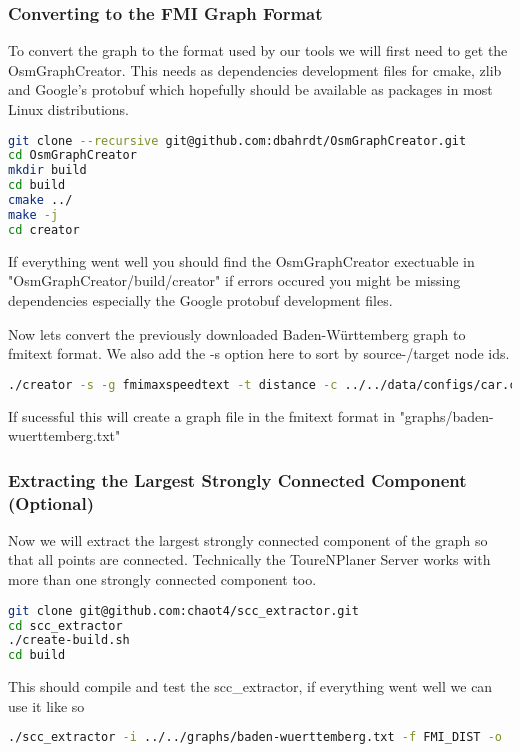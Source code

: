 \documentclass[titlepage,parskip=true]{scrartcl}
\begin{document}
\subsubsection{Converting to the FMI Graph Format}
To convert the graph to the format used by our tools we will first need to get
the OsmGraphCreator. This needs as dependencies development files for cmake,
zlib and Google's protobuf which hopefully should be available as packages in
most Linux distributions.
\begin{lstlisting}[language=bash]
git clone --recursive git@github.com:dbahrdt/OsmGraphCreator.git
cd OsmGraphCreator
mkdir build
cd build
cmake ../
make -j
cd creator
\end{lstlisting}
If everything went well you should find the OsmGraphCreator exectuable in
"OsmGraphCreator/build/creator" if errors occured you might be missing
dependencies especially the Google protobuf development files.

Now lets convert the previously downloaded Baden-Württemberg graph to fmitext format.
We also add the -s option here to sort by source-/target node ids.
\begin{lstlisting}[language=bash]
./creator -s -g fmimaxspeedtext -t distance -c ../../data/configs/car.cfg -o ../../../graphs/baden-wuerttemberg.txt ../../../graphs/baden-wuerttemberg-latest.osm.pbf
\end{lstlisting}
If sucessful this will create a graph file in the fmitext format in "graphs/baden-wuerttemberg.txt"
\subsubsection{Extracting the Largest Strongly Connected Component (Optional)}
Now we will extract the largest strongly connected component of the graph so
that all points are connected. Technically the ToureNPlaner Server works with
more than one strongly connected component too.
\begin{lstlisting}[language=bash]
git clone git@github.com:chaot4/scc_extractor.git
cd scc_extractor
./create-build.sh
cd build
\end{lstlisting}
This should compile and test the scc\_extractor, if everything went well we can use it like so
\begin{lstlisting}[language=bash]
./scc_extractor -i ../../graphs/baden-wuerttemberg.txt -f FMI_DIST -o ../../graphs/baden-wuerttemberg-scc.txt
\end{lstlisting}
\end{document}
